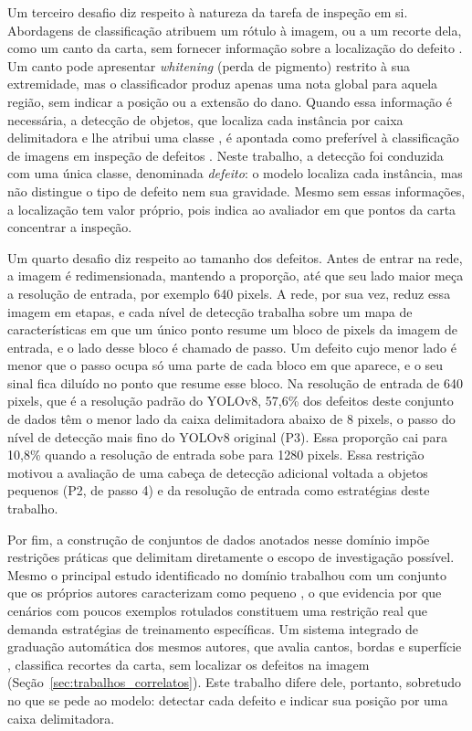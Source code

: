 \documentclass[
    12pt,                %
    openright,           %
    oneside,             %
    a4paper,             %
    english,             %
    brazil               %
]{abntex2}
\begin{document}
Um terceiro desafio diz respeito à natureza da tarefa de inspeção em si.
Abordagens de classificação atribuem um rótulo à imagem, ou a um recorte
dela, como um canto da carta, sem fornecer informação sobre a
localização do defeito \cite{Hussain2023}. Um canto pode apresentar
\textit{whitening} (perda de pigmento) restrito à sua extremidade, mas o classificador
produz apenas uma nota global para aquela região, sem indicar a posição
ou a extensão do dano. Quando essa informação é necessária, a detecção
de objetos, que localiza cada instância por caixa delimitadora e lhe
atribui uma classe \cite{Ramos2025}, é apontada como preferível à
classificação de imagens em inspeção de defeitos \cite{Hussain2023}.
Neste trabalho, a detecção foi conduzida com uma única classe,
denominada \textit{defeito}: o modelo localiza cada instância, mas não
distingue o tipo de defeito nem sua gravidade. Mesmo sem essas
informações, a localização tem valor próprio, pois indica ao avaliador
em que pontos da carta concentrar a inspeção.

Um quarto desafio diz respeito ao tamanho dos defeitos. Antes de entrar
na rede, a imagem é redimensionada, mantendo a proporção, até que seu
lado maior meça a resolução de entrada, por exemplo 640 pixels. A rede, por sua vez,
reduz essa imagem em etapas, e cada nível de detecção trabalha sobre um
mapa de características em que um único ponto resume um bloco de pixels
da imagem de entrada, e o lado desse bloco é chamado de passo. Um defeito
cujo menor lado é menor que o passo ocupa só uma parte de cada bloco em
que aparece, e o seu sinal fica diluído no ponto que resume esse
bloco. Na resolução de entrada de 640 pixels, que é a
resolução padrão do YOLOv8, 57,6\% dos defeitos deste conjunto de dados
têm o menor lado da caixa delimitadora abaixo de 8 pixels, o passo do
nível de detecção mais fino do YOLOv8 original (P3). Essa proporção cai
para 10,8\% quando a resolução de entrada sobe para 1280 pixels. Essa
restrição motivou a avaliação de uma cabeça de detecção adicional
voltada a objetos pequenos (P2, de passo 4) e da resolução de entrada
como estratégias deste trabalho.

Por fim, a construção de conjuntos de dados anotados nesse domínio
impõe restrições práticas que delimitam diretamente o escopo de
investigação possível. Mesmo o principal estudo identificado no domínio
trabalhou com um conjunto que os próprios autores caracterizam como
pequeno \cite{Nahar2025}, o que evidencia por que cenários com poucos
exemplos rotulados constituem uma restrição real que demanda
estratégias de treinamento específicas. Um sistema integrado de
graduação automática dos mesmos autores, que avalia cantos, bordas e
superfície \cite{Nahar2025b}, classifica recortes da carta, sem
localizar os defeitos na imagem (Seção~\ref{sec:trabalhos_correlatos}). Este trabalho difere
dele, portanto, sobretudo no que se pede ao modelo: detectar cada
defeito e indicar sua posição por uma caixa delimitadora.
\end{document}
